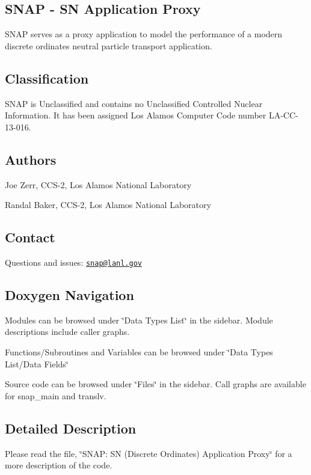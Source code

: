 \subsection*{S\-N\-A\-P -\/ S\-N Application Proxy}

S\-N\-A\-P serves as a proxy application to model the performance of a modern discrete ordinates neutral particle transport application.

\subsection*{Classification}

S\-N\-A\-P is Unclassified and contains no Unclassified Controlled Nuclear Information. It has been assigned Los Alamos Computer Code number L\-A-\/\-C\-C-\/13-\/016.

\subsection*{Authors}


\begin{DoxyItemize}
\item Joe Zerr, C\-C\-S-\/2, Los Alamos National Laboratory
\item Randal Baker, C\-C\-S-\/2, Los Alamos National Laboratory
\end{DoxyItemize}

\subsection*{Contact}

Questions and issues\-: \href{mailto:snap@lanl.gov}{\tt snap@lanl.\-gov}

\subsection*{Doxygen Navigation}

Modules can be browsed under \char`\"{}\-Data Types List\char`\"{} in the sidebar. Module descriptions include caller graphs.

Functions/\-Subroutines and Variables can be browsed under \char`\"{}\-Data Types List/\-Data Fields\char`\"{}

Source code can be browsed under \char`\"{}\-Files\char`\"{} in the sidebar. Call graphs are available for snap\-\_\-main and translv.

\subsection*{Detailed Description}

Please read the file, \char`\"{}\-S\-N\-A\-P\-: S\-N (\-Discrete Ordinates) Application Proxy\char`\"{} for a more description of the code. 